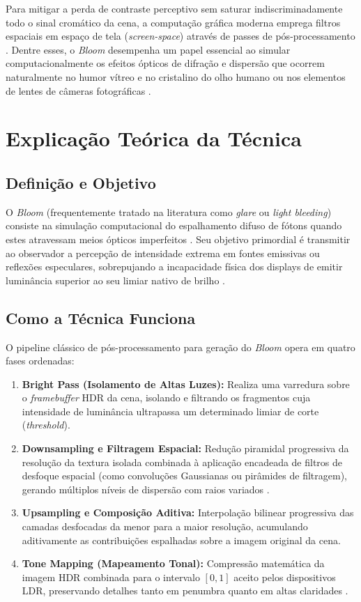 \documentclass[12pt,a4paper]{article}
\begin{document}
Para mitigar a perda de contraste perceptivo sem saturar indiscriminadamente todo o sinal cromático da cena, a computação gráfica moderna emprega filtros espaciais em espaço de tela (\textit{screen-space}) através de passes de pós-processamento \cite{cadik2005naturalness}. Dentre esses, o \textit{Bloom} desempenha um papel essencial ao simular computacionalmente os efeitos ópticos de difração e dispersão que ocorrem naturalmente no humor vítreo e no cristalino do olho humano ou nos elementos de lentes de câmeras fotográficas \cite{spencer1995glare, cadik2005naturalness}.

\section{Explicação Teórica da Técnica}

\subsection{Definição e Objetivo}
O \textit{Bloom} (frequentemente tratado na literatura como \textit{glare} ou \textit{light bleeding}) consiste na simulação computacional do espalhamento difuso de fótons quando estes atravessam meios ópticos imperfeitos \cite{spencer1995glare}. Seu objetivo primordial é transmitir ao observador a percepção de intensidade extrema em fontes emissivas ou reflexões especulares, sobrepujando a incapacidade física dos displays de emitir luminância superior ao seu limiar nativo de brilho \cite{cadik2005naturalness}.

\subsection{Como a Técnica Funciona}
\label{sec:funciona}
O pipeline clássico de pós-processamento para geração do \textit{Bloom} opera em quatro fases ordenadas:
\begin{enumerate}
    \item \textbf{Bright Pass (Isolamento de Altas Luzes):} Realiza uma varredura sobre o \textit{framebuffer} HDR da cena, isolando e filtrando os fragmentos cuja intensidade de luminância ultrapassa um determinado limiar de corte (\textit{threshold}).
    \item \textbf{Downsampling e Filtragem Espacial:} Redução piramidal progressiva da resolução da textura isolada combinada à aplicação encadeada de filtros de desfoque espacial (como convoluções Gaussianas ou pirâmides de filtragem), gerando múltiplos níveis de dispersão com raios variados \cite{cadik2005naturalness}.
    \item \textbf{Upsampling e Composição Aditiva:} Interpolação bilinear progressiva das camadas desfocadas da menor para a maior resolução, acumulando aditivamente as contribuições espalhadas sobre a imagem original da cena.
    \item \textbf{Tone Mapping (Mapeamento Tonal):} Compressão matemática da imagem HDR combinada para o intervalo $[0, 1]$ aceito pelos dispositivos LDR, preservando detalhes tanto em penumbra quanto em altas claridades \cite{reinhard2002tone}.
\end{enumerate}
\end{document}
